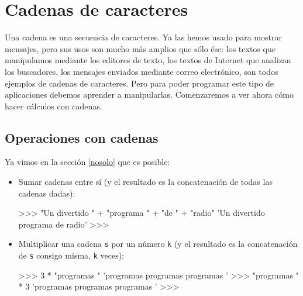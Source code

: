 
%

\chapter{Cadenas de caracteres}

Una cadena es una secuencia de caracteres. Ya las hemos usado para mostrar
mensajes, pero sus usos son mucho más amplios que sólo ése: los textos que
manipulamos mediante los editores de texto, los textos de Internet que
analizan los buscadores, los mensajes enviados mediante correo electrónico,
son todos ejemplos de cadenas de caracteres. Pero para poder programar este
tipo de aplicaciones debemos aprender a manipularlas. Comenzaremos a ver
ahora cómo hacer cálculos con cadenas.

\section{Operaciones con cadenas}

Ya vimos en la sección \ref{nosolo} que es posible:

\begin{itemize}
\item Sumar cadenas entre sí (y el resultado es la concatenación
de todas las cadenas dadas):

\begin{codigo-python-sn}
>>> "Un divertido " + "programa " + "de " + "radio"
'Un divertido programa de radio'
>>>
\end{codigo-python-sn}

\item Multiplicar una cadena \lstinline+s+ por un número \lstinline+k+ (y
el resultado es la concatenación de \lstinline+s+ consigo misma,
\lstinline+k+ veces):

\begin{codigo-python-sn}
>>> 3 * "programas "
'programas programas programas '
>>> "programas " * 3
'programas programas programas '
>>>
\end{codigo-python-sn}
\end{itemize}

